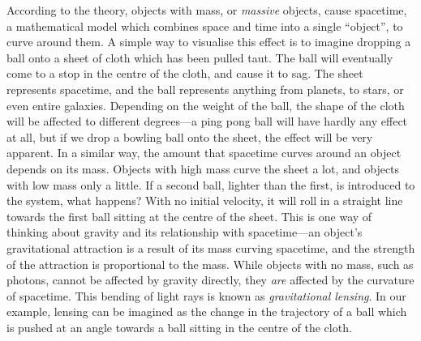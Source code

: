 \documentclass[a4paper,11pt]{article}
\begin{document}
   According to the theory, objects with mass, or \emph{massive} objects, cause
   spacetime, a mathematical model which combines space and time into a single
   ``object'', to curve around them. A simple way to visualise this effect is to
   imagine dropping a ball onto a sheet of cloth which has been pulled taut. The
   ball will eventually come to a stop in the centre of the cloth, and cause it
   to sag. The sheet represents spacetime, and the ball represents anything from
   planets, to stars, or even entire galaxies. Depending on the weight of the
   ball, the shape of the cloth will be affected to different degrees---a ping
   pong ball will have hardly any effect at all, but if we drop a bowling ball
   onto the sheet, the effect will be very apparent. In a similar way, the
   amount that spacetime curves around an object depends on its mass. Objects
   with high mass curve the sheet a lot, and objects with low mass only a
   little. If a second ball, lighter than the first, is introduced to the
   system, what happens?  With no initial velocity, it will roll in a straight
   line towards the first ball sitting at the centre of the sheet. This is one
   way of thinking about gravity and its relationship with spacetime---an
   object's gravitational attraction is a result of its mass curving spacetime,
   and the strength of the attraction is proportional to the mass. While objects
   with no mass, such as photons, cannot be affected by gravity directly, they
   \emph{are} affected by the curvature of spacetime. This bending of light rays
   is known as \emph{gravitational lensing}. In our example, lensing can be
   imagined as the change in the trajectory of a ball which is pushed at an
   angle towards a ball sitting in the centre of the cloth.
\end{document}

